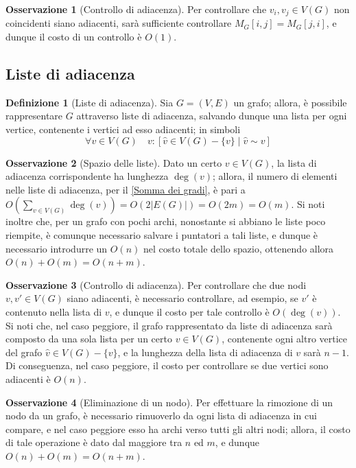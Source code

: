 \documentclass[14pt]{extreport}
\theoremstyle{definition}
\newtheorem{definition}{Definizione}[subsection]
\theoremstyle{definition}
\newtheorem{remark}{Osservazione}[subsection]
\begin{document}
\begin{remark}[Controllo di adiacenza]
    Per controllare che $v_i, v_j \in V(G)$ non coincidenti siano adiacenti, sarà sufficiente controllare $M_G[i, j] = M_G[j, i]$, e dunque il costo di un controllo è $O(1)$.
\end{remark}

\subsection{Liste di adiacenza}

\begin{definition}[Liste di adiacenza]
    Sia $G = (V, E)$ un grafo; allora, è possibile rappresentare $G$ attraverso liste di adiacenza, salvando dunque una lista per ogni vertice, contenente i vertici ad esso adiacenti; in simboli $$\forall v \in V(G) \quad v:[\hat{v} \in V(G) - \{v\} \mid \hat{v} \sim v]$$
\end{definition}

\begin{remark}[Spazio delle liste]
    Dato un certo $v \in V(G)$, la lista di adiacenza corrispondente ha lunghezza $\deg(v)$; allora, il numero di elementi nelle liste di adiacenza, per il \cref{Somma dei gradi}, è pari a $\displaystyle O \left(\sum_{v \in V(G)}{\deg(v)}\right) = O\left( 2 |E(G)| \right)=O(2m) = O(m)$. Si noti inoltre che, per un grafo con pochi archi, nonostante si abbiano le liste poco riempite, è comunque necessario salvare i puntatori a tali liste, e dunque è necessario introdurre un $O(n)$ nel costo totale dello spazio, ottenendo allora $O(n) + O(m) = O(n + m)$.
\end{remark}

\begin{remark}[Controllo di adiacenza]
    Per controllare che due nodi $v, v' \in V(G)$ siano adiacenti, è necessario controllare, ad esempio, se $v'$ è contenuto nella lista di $v$, e dunque il costo per tale controllo è $O(\deg(v))$.
    Si noti che, nel caso peggiore, il grafo rappresentato da liste di adiacenza sarà composto da una sola lista per un certo $v \in V(G)$, contenente ogni altro vertice del grafo $\hat{v} \in V(G) - \{v\}$, e la lunghezza della lista di adiacenza di $v$ sarà $n - 1$. Di conseguenza, nel caso peggiore, il costo per controllare se due vertici sono adiacenti è $O(n)$.
\end{remark}

\begin{remark}[Eliminazione di un nodo]
    Per effettuare la rimozione di un nodo da un grafo, è necessario rimuoverlo da ogni lista di adiacenza in cui compare, e nel caso peggiore esso ha archi verso tutti gli altri nodi; allora, il costo di tale operazione è dato dal maggiore tra $n$ ed $m$, e dunque $O(n) + O(m) = O(n + m)$.
\end{remark}
\end{document}
